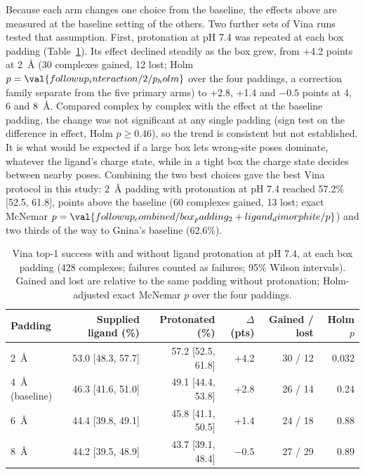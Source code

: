 Because each arm changes one choice from the baseline, the effects above are measured at
the baseline setting of the others. Two further sets of Vina runs tested that assumption.
First, protonation at pH 7.4 was repeated at each box padding (Table~\ref{tab:interaction}).
Its effect declined steadily as the box grew, from +4.2 points at \SI{2}{\angstrom} (30
complexes gained, 12 lost; Holm $p = \val{followup_interaction/2/p_holm}$ over the four paddings, a correction family
separate from the five primary arms) to +2.8, +1.4 and
$-0.5$ points at 4, 6 and \SI{8}{\angstrom}. Compared complex by complex with the effect at
the baseline padding, the change was not significant at any single padding (sign test on
the difference in effect, Holm $p \ge 0.46$), so the trend is consistent but not
established. It is what would be expected if a large box lets wrong-site poses dominate,
whatever the ligand's charge state, while in a tight box the charge state decides between
nearby poses. Combining the two best choices gave the best Vina protocol in this study:
\SI{2}{\angstrom} padding with protonation at pH 7.4 reached 57.2\% [52.5, 61.8], 
points above the baseline (60 complexes gained, 13 lost; exact McNemar
$p = \val{followup_combined/box_padding_2+ligand_dimorphite/p}$) and two thirds of the way to Gnina's baseline (62.6\%).

\begin{table}[h]
  \centering
  \caption{Vina top-1 success with and without ligand protonation at pH 7.4, at each box
    padding (428 complexes; failures counted as failures; 95\% Wilson intervals). Gained
    and lost are relative to the same padding without protonation; Holm-adjusted exact
    McNemar $p$ over the four paddings.}
  \label{tab:interaction}
  \begin{tabular}{lrrrrr}
    \toprule
    Padding & Supplied ligand (\%) & Protonated (\%) & $\Delta$ (pts) & Gained / lost & Holm $p$ \\
    \midrule
    \SI{2}{\angstrom} & 53.0 [48.3, 57.7] & 57.2 [52.5, 61.8] & +4.2 & 30 / 12 & 0.032 \\
    \SI{4}{\angstrom} (baseline) & 46.3 [41.6, 51.0] & 49.1 [44.4, 53.8] & +2.8 & 26 / 14 & 0.24 \\
    \SI{6}{\angstrom} & 44.4 [39.8, 49.1] & 45.8 [41.1, 50.5] & +1.4 & 24 / 18 & 0.88 \\
    \SI{8}{\angstrom} & 44.2 [39.5, 48.9] & 43.7 [39.1, 48.4] & $-0.5$ & 27 / 29 & 0.89 \\
    \bottomrule
  \end{tabular}
\end{table}

